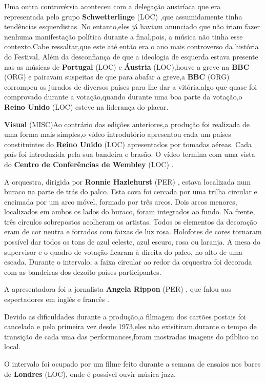 \documentclass[12pt,a4paper]{article}
\begin{document}
Uma outra controvérsia aconteceu com a delegação austríaca que era representada pelo grupo \textbf{Schwetterlinge} (LOC) ,que assumidamente tinha tendências esquerdistas. No entanto,eles já haviam anunciado que não iriam fazer nenhuma manifestação política durante a final,pois, a música não tinha esse contexto.Cabe ressaltar,que este até então era o ano mais controverso da história do Festival. Além da desconfiança de que a ideologia de esquerda estava presente nas as músicas de \textbf{Portugal} (LOC) e \textbf{Áustria} (LOC),houve a greve na \textbf{BBC} (ORG) e pairavam suspeitas de que para abafar a greve,a \textbf{BBC} (ORG) corrompeu os jurados de diversos países para lhe dar a vitória,algo que quase foi comprovado durante a votação,quando durante uma boa parte da votação,o \textbf{Reino Unido} (LOC) esteve na liderança do placar.



\textbf{Visual} (MISC)Ao contrário das edições anteriores,a produção foi realizada de uma forma mais simples,o vídeo introdutório apresentou cada um países constituintes do \textbf{Reino Unido} (LOC) apresentados por tomadas aéreas. Cada país foi introduzida pela sua bandeira e brasão. O vídeo termina com uma vista do \textbf{Centro de Conferências de Wembley} (LOC) .

A orquestra, dirigida por \textbf{Ronnie Hazlehurst} (PER) , estava localizada num buraco na parte de trás do palco. Esta cova foi cercada por uma trilha circular e encimada por um arco móvel, formado por três arcos. Dois arcos menores, localizados em ambos os lados do buraco, foram integrados ao fundo. Na frente, três círculos sobrepostos acolheram os artistas. Todos os elementos da decoração eram de cor neutra e forrados com faixas de luz rosa. Holofotes de cores tornaram possível dar todos os tons de azul celeste, azul escuro, rosa ou laranja. A mesa do supervisor e o quadro de votação ficaram à direita do palco, no alto de uma escada. Durante o intervalo, a faixa circular ao redor da orquestra foi decorada com as bandeiras dos dezoito países participantes.

A apresentadora foi a jornalista \textbf{Angela Rippon} (PER) , que falou aos espectadores em inglês e francês .

Devido as dificuldades durante a produção,a filmagem dos cartões postais foi cancelada e pela primeira vez desde 1973,eles não exisitiram,durante o tempo de transição de cada uma das performances,foram mostradas imagens do público no local.

O intervalo foi ocupado por um filme feito durante a semana de ensaios nos bares de \textbf{Londres} (LOC), onde é possível ouvir música jazz.
\end{document}
